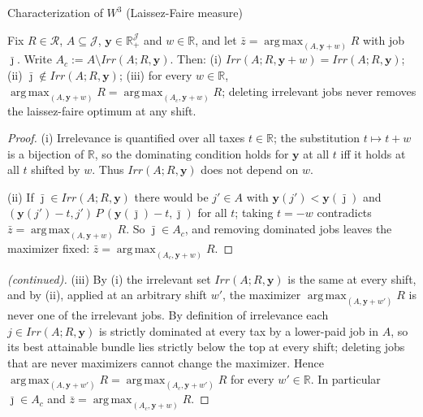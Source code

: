 \documentclass[10pt]{beamer}
\DeclareMathOperator*{\argmax}{arg\,max}
\begin{document}
\begin{frame}[allowframebreaks]{Characterization of $W^3$ (Laissez-Faire measure)}
\framebreak

\begin{lemma}
Fix $R\in\mathcal R$, $A\subseteq\mathcal J$, $\mathbf y\in\mathbb R_+^{\mathcal
J}$ and $w\in\mathbb R$, and let $\bar z=\argmax_{(A,\mathbf y+w)}R$ with job
$\bar\jmath$. Write $A_c:=A\setminus Irr(A;R,\mathbf y)$. Then:
(i) $Irr(A;R,\mathbf y+w)=Irr(A;R,\mathbf y)$;
(ii) $\bar\jmath\notin Irr(A;R,\mathbf y)$;
(iii) for every $w\in\mathbb R$, $\argmax_{(A,\mathbf y+w)}R=\argmax_{(A_c,\mathbf
y+w)}R$; deleting irrelevant jobs never removes the laissez-faire optimum at any
shift.
\end{lemma}

\begin{proof}
(i) Irrelevance is quantified over all taxes $t\in\mathbb R$; the substitution
$t\mapsto t+w$ is a bijection of $\mathbb R$, so the dominating condition holds
for $\mathbf y$ at all $t$ iff it holds at all $t$ shifted by $w$. Thus
$Irr(A;R,\mathbf y)$ does not depend on $w$.

(ii) If $\bar\jmath\in Irr(A;R,\mathbf y)$ there would be $j'\in A$ with
$\mathbf y(j')<\mathbf y(\bar\jmath)$ and
$(\mathbf y(j')-t,j')\,P\,(\mathbf y(\bar\jmath)-t,\bar\jmath)$ for all $t$;
taking $t=-w$ contradicts $\bar z=\argmax_{(A,\mathbf y+w)}R$. So
$\bar\jmath\in A_c$, and removing dominated jobs leaves the maximizer fixed:
$\bar z=\argmax_{(A_c,\mathbf y+w)}R$.
\end{proof}
\framebreak
\begin{proof}[(continued)]
(iii) By (i) the irrelevant set $Irr(A;R,\mathbf y)$ is the same at every shift,
and by (ii), applied at an arbitrary shift $w'$, the maximizer
$\argmax_{(A,\mathbf y+w')}R$ is never one of the irrelevant jobs. By definition
of irrelevance each $j\in Irr(A;R,\mathbf y)$ is strictly dominated at every tax
by a lower-paid job in $A$, so its best attainable bundle lies strictly below
the top at every shift; deleting jobs that are never maximizers cannot change
the maximizer. Hence $\argmax_{(A,\mathbf y+w')}R=\argmax_{(A_c,\mathbf
y+w')}R$ for every $w'\in\mathbb R$. In particular $\bar\jmath\in A_c$ and
$\bar z=\argmax_{(A_c,\mathbf y+w)}R$.
\end{proof}


\end{frame}
\end{document}

